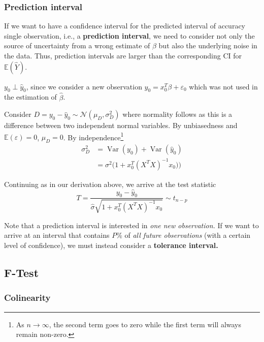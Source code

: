 \documentclass[11pt, %
	oneside, %
	english, %
	onehalfspacing, %
	]{article} %
\numberwithin{equation}{section}
\begin{document}
\subsubsection*{Prediction interval}

If we want to have a confidence interval for the predicted interval of accuracy single observation, i.e., a \textbf{prediction interval}, we need to consider not only the source of uncertainty from a wrong estimate of $\beta$ but also the underlying noise in the data. Thus, prediction intervals are larger than the corresponding CI for $\mathbb{E} (\hat{Y})$.

$y_0 \perp \hat{y}_0$, since we consider a new observation $y_0 = x_0^T \beta + \varepsilon_0$ which was not used in the estimation of $\hat{\beta}$.

Consider $D = y_0 - \hat{y}_0 \sim \mathcal{N}(\mu_D, \sigma^2_D)$ where normality follows as this is a difference between two independent normal variables. By unbiasedness and $\mathbb{E}(\varepsilon) = 0$, $\mu_D = 0$. By independence\footnote{As $n\to \infty$, the second term goes to zero while the first term will always remain non-zero.}
\begin{align*}
    \sigma^2_D &= \operatorname{Var}(y_0) + \operatorname{Var}(\hat{y}_0) \\
    &= \sigma^2 \big( 1 + x_0^T (X^TX)^{-1} x_0 \big))
\end{align*}

Continuing as in our derivation above, we arrive at the test statistic
\begin{equation*}
    T = \frac{y_0 - \hat{y}_0}{\hat{\sigma} \sqrt{1 + x_0^T (X^TX)^{-1} x_0 }} \sim t_{n-p}
\end{equation*}

Note that a prediction interval is interested in \emph{one new observation.} If we want to arrive at an interval that contains $P$\% of \emph{all future observations} (with a certain level of confidence), we must instead consider a \textbf{tolerance interval.}



\subsection{F-Test}

\subsubsection*{Colinearity}
\end{document}
